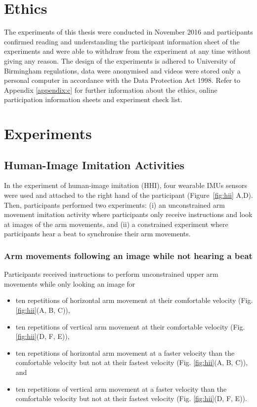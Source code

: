 \section{Ethics}
The experiments of this thesis were conducted in November 2016 and
participants confirmed reading and understanding the participant information 
sheet of the experiments and were able to withdraw from the experiment 
at any time without giving any reason.
The design of the experiments is adhered to University of Birmingham 
regulations, data were anonymised and videos were stored 
only a personal computer in accordance with the Data Protection Act 1998.
Refer to Appendix \ref{appendix:c} for further information about the 
ethics, online participation information sheets and experiment check list.


\section{Experiments}

\subsection{Human-Image Imitation Activities} \label{sec:experiment:hii}
In the experiment of human-image imitation (HHI), four wearable IMUs sensors 
were used and attached to the right hand of the participant 
(Figure~\ref{fig:hii} A,D). 
Then, participants performed two experiments: 
(i) an unconstrained arm movement imitation activity where participants 
only receive instructions and look at images of the arm movements, and
(ii) a constrained experiment where participants hear a beat 
to synchronise their arm movements. 

\subsubsection{Arm movements following an image while not hearing a beat}
Participants received instructions to perform unconstrained upper arm 
movements while only looking an image for
\begin{itemize}[noitemsep,topsep=0pt]
\item ten repetitions of horizontal arm movement at their comfortable velocity
(Fig. \ref{fig:hii}(A, B, C)), 
\item ten repetitions of vertical arm movement at their comfortable velocity 
(Fig. \ref{fig:hii}(D, F, E)),
\item ten repetitions of horizontal arm movement at a faster velocity than 
the comfortable velocity but not at their fastest velocity 
(Fig. \ref{fig:hii}(A, B, C)), and 
\item ten repetitions of vertical arm movement at a faster velocity than the 
comfortable velocity but not at their fastest velocity
(Fig. \ref{fig:hii}(D, F, E)).
\end{itemize}


